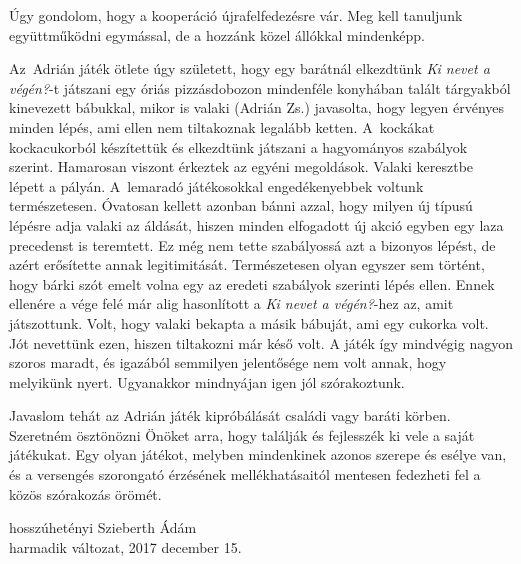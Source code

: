 \documentclass[12pt,a4paper]{article}
\begin{document}
Úgy gondolom, hogy a kooperáció újrafelfedezésre vár.
Meg kell tanuljunk együttműködni egymással, de a hozzánk közel állókkal mindenképp.

Az~Adrián játék ötlete úgy született, hogy egy barátnál elkezdtünk \emph{Ki nevet a végén?}-t játszani egy óriás pizzásdobozon mindenféle konyhában talált tárgyakból kinevezett bábukkal, mikor is valaki (Adrián Zs.) javasolta, hogy legyen érvényes minden lépés, ami ellen nem tiltakoznak legalább ketten.
A~kockákat kockacukorból készítettük és elkezdtünk játszani a hagyományos szabályok szerint.
Hamarosan viszont érkeztek az egyéni megoldások.
Valaki keresztbe lépett a pályán.
A~lemaradó játékosokkal engedékenyebbek voltunk természetesen.
Óvatosan kellett azonban bánni azzal, hogy milyen új típusú lépésre adja valaki az áldását, hiszen minden elfogadott új akció egyben egy laza precedenst is teremtett.
Ez még nem tette szabályossá azt a bizonyos lépést, de azért erősítette annak legitimitását.
Természetesen olyan egyszer sem történt, hogy bárki szót emelt volna egy az eredeti szabályok szerinti lépés ellen.
Ennek ellenére a vége felé már alig hasonlított a \emph{Ki nevet a végén?}-hez az, amit játszottunk.
Volt, hogy valaki bekapta a másik bábuját, ami egy cukorka volt.
Jót nevettünk ezen, hiszen tiltakozni már késő volt.
A játék így mindvégig nagyon szoros maradt, és igazából semmilyen jelentősége nem volt annak, hogy melyikünk nyert.
Ugyanakkor mindnyájan igen jól szórakoztunk.

Javaslom tehát az Adrián játék kipróbálását családi vagy baráti körben.
Szeretném ösztönözni Önöket arra, hogy találják és fejlesszék ki vele a saját játékukat.
Egy olyan játékot, melyben mindenkinek azonos szerepe és esélye van, és a versengés szorongató érzésének mellékhatásaitól mentesen fedezheti fel a közös szórakozás örömét.

\par\raggedleft hosszúhetényi Szieberth Ádám\\
harmadik változat, 2017 december 15.
\end{document}
